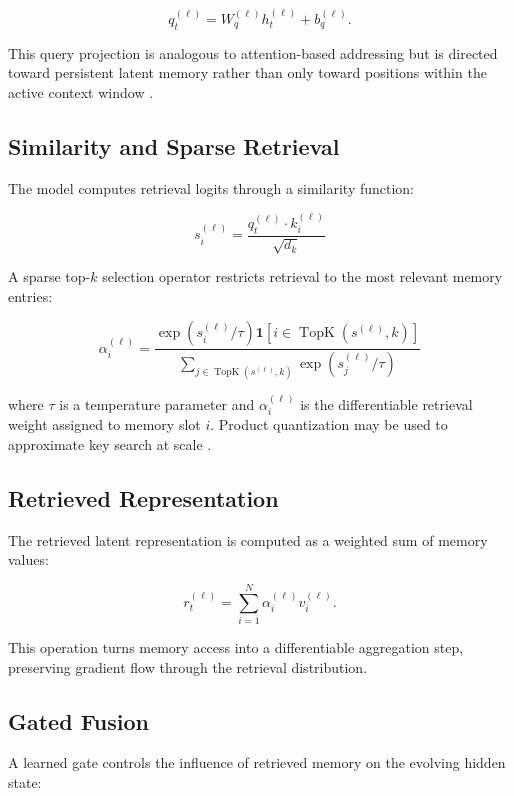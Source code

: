 \begin{equation}
q_t^{(\ell)} = W_q^{(\ell)} h_t^{(\ell)} + b_q^{(\ell)}.
\end{equation}

This query projection is analogous to attention-based addressing but is directed toward persistent latent memory rather than only toward positions within the active context window \cite{Bahdanau2016, Vaswani2017}.

\subsection{Similarity and Sparse Retrieval}
The model computes retrieval logits through a similarity function:

\begin{equation}
s_i^{(\ell)} = \frac{q_t^{(\ell)} \cdot k_i^{(\ell)}}{\sqrt{d_k}}
\end{equation}

A sparse top-$k$ selection operator restricts retrieval to the most relevant memory entries: 

\begin{equation}
\alpha_i^{(\ell)} = \frac{\exp(s_i^{(\ell)}/\tau)\mathbf{1}[i \in \operatorname{TopK}(s^{(\ell)}, k)]}{\sum_{j \in \operatorname{TopK}(s^{(\ell)}, k)} \exp(s_j^{(\ell)}/\tau)}
\end{equation}

where $\tau$ is a temperature parameter and $\alpha_i^{(\ell)}$ is the differentiable retrieval weight assigned to memory slot $i$. Product quantization may be used to approximate key search at scale \cite{Jgou2011, Johnson2021}.

\subsection{Retrieved Representation}
The retrieved latent representation is computed as a weighted sum of memory values:

\begin{equation}
r_t^{(\ell)} = \sum_{i=1}^{N} \alpha_i^{(\ell)} v_i^{(\ell)}.
\end{equation} 

This operation turns memory access into a differentiable aggregation step, preserving gradient flow through the retrieval distribution.

\subsection{Gated Fusion}
A learned gate controls the influence of retrieved memory on the evolving hidden state:

